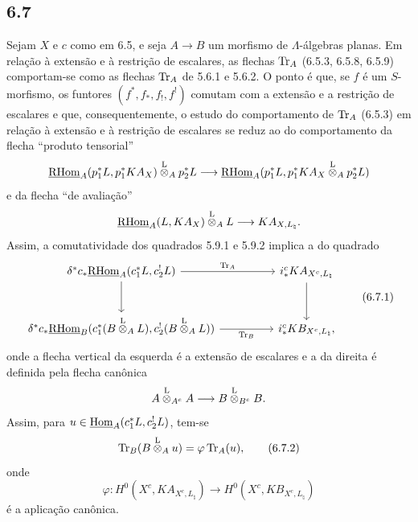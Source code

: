 \subsection*{6.7}
Sejam $X$ e $c$ como em 6.5, e seja $A\to B$ um morfismo de $\Lambda$-álgebras planas. Em relação à extensão e à restrição de escalares, as flechas $\operatorname{Tr}_A$ (6.5.3, 6.5.8, 6.5.9) comportam-se como as flechas $\operatorname{Tr}_A$ de 5.6.1 e 5.6.2. O ponto é que, se $f$ é um $S$-morfismo, os funtores $(f^*,f_*,f_!,f^!)$ comutam com a extensão e a restrição de escalares e que, consequentemente, o estudo do comportamento de $\operatorname{Tr}_A$ (6.5.3) em relação à extensão e à restrição de escalares se reduz ao do comportamento da flecha ``produto tensorial''
\[
\underline{\mathrm{RHom}}_A(p_1^*L,p_1^*KA_X)\overset{\mathrm L}{\otimes}_Ap_2^*L
\longrightarrow
\underline{\mathrm{RHom}}_A(p_1^*L,p_1^*KA_X\overset{\mathrm L}{\otimes}_Ap_2^*L)
\]
e da flecha ``de avaliação''
\[
\underline{\mathrm{RHom}}_A(L,KA_X)\overset{\mathrm L}{\otimes}_A L\longrightarrow KA_{X,L_{\natural}}.
\]
Assim, a comutatividade dos quadrados 5.9.1 e 5.9.2 implica a do quadrado
\begin{equation}
\begin{tikzcd}[column sep=huge,row sep=large]
\delta^*c_*\uRHom_A(c_1^*L,c_2^!L) \arrow[r,"\Tr_A"] \arrow[d]
& i_*^cKA_{X^c,L_{\natural}} \arrow[d]\\
\delta^*c_*\uRHom_B(c_1^*(B\lten_A L),c_2^!(B\lten_A L)) \arrow[r,"\Tr_B"']
& i_*^cKB_{X^c,L_{\natural}},
\end{tikzcd}
\tag{6.7.1}
\end{equation}
onde a flecha vertical da esquerda é a extensão de escalares e a da direita é definida pela flecha canônica
\[
A\overset{\mathrm L}{\otimes}_{A^e}A\longrightarrow B\overset{\mathrm L}{\otimes}_{B^e}B.
\]
Assim, para $u\in\underline{\operatorname{Hom}}_A(c_1^*L,c_2^!L)$, tem-se
\begin{equation}
\operatorname{Tr}_B(B\overset{\mathrm L}{\otimes}_Au)=\varphi\operatorname{Tr}_A(u),
\tag{6.7.2}
\end{equation}
onde
\[
\varphi:H^0(X^c,KA_{X^c,L_{\natural}})\longrightarrow H^0(X^c,KB_{X^c,L_{\natural}})
\]
é a aplicação canônica.

